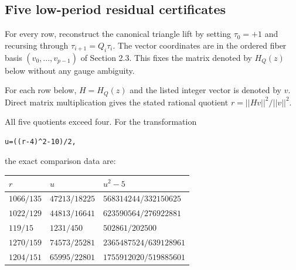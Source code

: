 \subsection{Five low-period residual certificates}

For every row, reconstruct the canonical triangle lift by setting
\(\tau_0=+1\) and recursing through \(\tau_{i+1}=Q_i \tau_i\). The vector coordinates
are in the ordered fiber basis \((v_0,...,v_{p-1})\) of Section 2.3. This fixes
the matrix denoted by \(H_Q(z)\) below without any gauge ambiguity.

For each row below, \(H=H_Q(z)\) and the listed integer vector is denoted by
\(v\). Direct matrix multiplication gives the stated rational quotient
\(r=||Hv||^2/||v||^2\).

\begin{center}
\end{center}

All five quotients exceed four. For the transformation

\begin{lstlisting}[language={}]
u=((r-4)^2-10)/2,
\end{lstlisting}

the exact comparison data are:

\begin{center}
\begin{tabular}{lll}
\toprule
\(r\) & \(u\) & \(u^2-5\) \\
\midrule
\(1066/135\) & \(47213/18225\) & \(568314244/332150625\) \\
\(1022/129\) & \(44813/16641\) & \(623590564/276922881\) \\
\(119/15\) & \(1231/450\) & \(502861/202500\) \\
\(1270/159\) & \(74573/25281\) & \(2365487524/639128961\) \\
\(1204/151\) & \(65995/22801\) & \(1755912020/519885601\) \\
\bottomrule
\end{tabular}%
\end{center}

